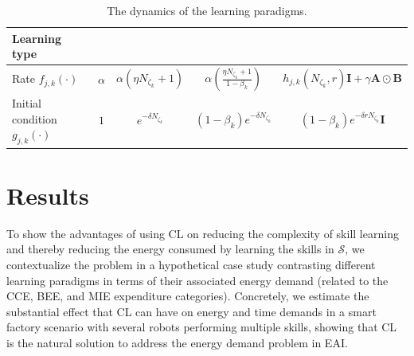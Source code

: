 \documentclass[12pt]{article}
\begin{document}
\begin{table}[!ht]
\caption{The dynamics of the learning paradigms.\label{tab:learning_paradigms_expressions}}
\begin{center}
\begin{adjustbox}{width=\textwidth}
\begin{tabular}{|l||*{4}{c|}}\hline
	Learning type
	&\makebox[3em]{IsL}&\makebox[3em]{IL}&\makebox[3em]{TIL}
	&\makebox[3em]{CL}\\\hline\hline
	Rate $f_{j,k}\left(\cdot \right)$  &$ \alpha$ & $ \alpha\left(\eta N_{\zeta_k} + 1 \right)$ & $\alpha \left( \frac{\eta N_{\zeta_k} + 1}{1 - \beta_k} \right)$ & $h_{j,k}\left(N_{\zeta_k},r\right) \bm{I} + \gamma \bm{A} \odot \bm{B}$ \\\hline
	Initial condition $g_{j,k}\left(\cdot \right)$ &$1$ & $e^{-\delta N_{\zeta_k}}$ & $(1-\beta_k) e^{-\delta N_{\zeta_k}}$ & $(1-\beta_k) e^{-\delta r N_{\zeta_k}} \bm{I}$ \\\hline
\end{tabular}
\end{adjustbox}
\end{center}	
\end{table}
\section*{Results}\label{sec_use_case}
To show the advantages of using CL on reducing the complexity of skill learning and thereby reducing the energy consumed by learning the skills in $\mathcal{S} $, we contextualize the problem in a hypothetical case study contrasting different learning paradigms in terms of their associated energy demand (related to the CCE, BEE, and MIE expenditure categories). Concretely, we estimate the substantial effect that CL can have on energy and time demands in a smart factory scenario with several robots performing multiple skills, showing that CL is the natural solution to address the energy demand problem in EAI.
\end{document}
